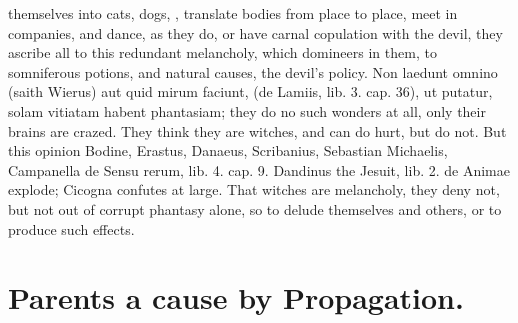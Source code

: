 {themselves into cats, dogs, \etc{}, translate bodies from place to place,
meet in companies, and dance, as they do, or have carnal copulation
with the devil, they ascribe all to this redundant melancholy, which
domineers in them, to  somniferous potions, and natural causes,
the devil's policy. Non laedunt omnino (saith Wierus) aut quid mirum
faciunt, (de Lamiis, lib. 3. cap. 36), ut putatur, solam vitiatam
habent phantasiam; they do no such wonders at all, only their
brains are crazed. They think they are witches, and can do
hurt, but do not. But this opinion Bodine, Erastus, Danaeus,
Scribanius, Sebastian Michaelis, Campanella de Sensu rerum, lib. 4.
cap. 9. Dandinus the Jesuit, lib. 2. de Animae explode;
Cicogna confutes at large. That witches are melancholy, they deny
not, but not out of corrupt phantasy alone, so to delude themselves and
others, or to produce such effects.

\section{Parents a cause by Propagation.}

}

